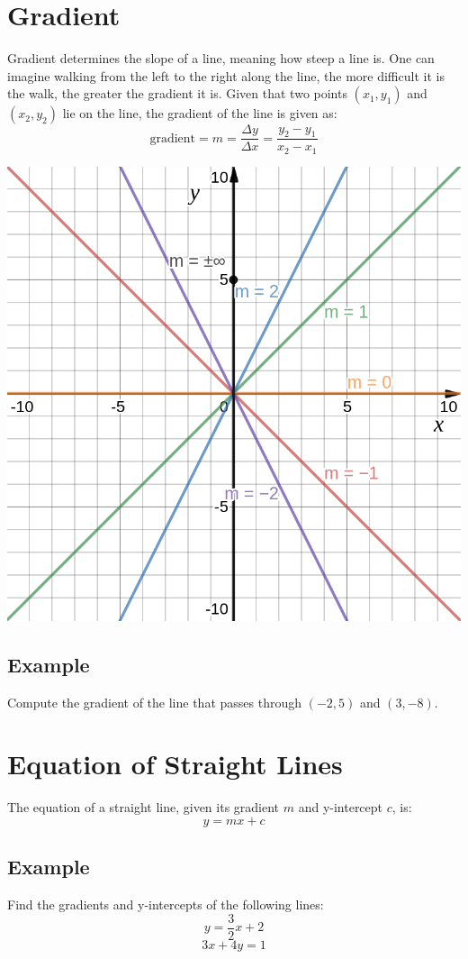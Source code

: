 \documentclass[a4paper,12pt]{article}
\begin{document}
\section{Gradient}
Gradient determines the slope of a line, meaning how steep a line is.
One can imagine walking from the left to the right along the line,
the more difficult it is the walk, the greater the gradient it is.
Given that two points \((x_1,y_1)\) and \((x_2,y_2)\) lie on the line,
the gradient of the line is given as:
\[\text{gradient}=m=\frac{\Delta y}{\Delta x}=\frac{y_2-y_1}{x_2-x_1}\]
\begin{center}
\includegraphics[width=.75\textwidth]{gradient.png}
\end{center}
\subsection{Example}
Compute the gradient of the line that passes through \((-2,5)\) and \((3,-8)\).

\section{Equation of Straight Lines}
The equation of a straight line, given its gradient \(m\) and 
y-intercept \(c\), is:
\[y=mx+c\]
\subsection{Example}
Find the gradients and y-intercepts of the following lines:
\[y=\frac32x+2\]
\[3x+4y=1\]
\newpage
\end{document}
